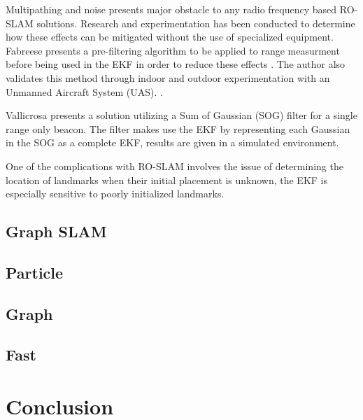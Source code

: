 \documentclass[conference]{IEEEtran}
\begin{document}
Multipathing and noise presents major obstacle to any radio frequency based RO-SLAM solutions. Research and experimentation has been conducted to determine how these effects can be mitigated without the use of specialized equipment. Fabreese presents a pre-filtering algorithm to be applied to range measurment before being used in the EKF in order to reduce these effects \cite{Fabresse2014}. The author also validates this method through indoor and outdoor experimentation with an Unmanned Aircraft System (UAS). \cite{Fabresse2016}. 



Vallicrosa presents a solution utilizing a Sum of Gaussian (SOG) filter for a single range only beacon. The filter makes use the EKF by representing each Gaussian in the SOG as a complete EKF, results are given in a simulated environment.\cite{Vallicrosa2015}

One of the complications with RO-SLAM involves the issue of determining the location of landmarks when their initial placement is unknown, the EKF is especially sensitive to poorly initialized landmarks. 




\subsection{Graph SLAM}
\subsection{Particle}
\subsection{Graph}
\subsection{Fast}

\section{Conclusion}


	
	
	
\end{document}
